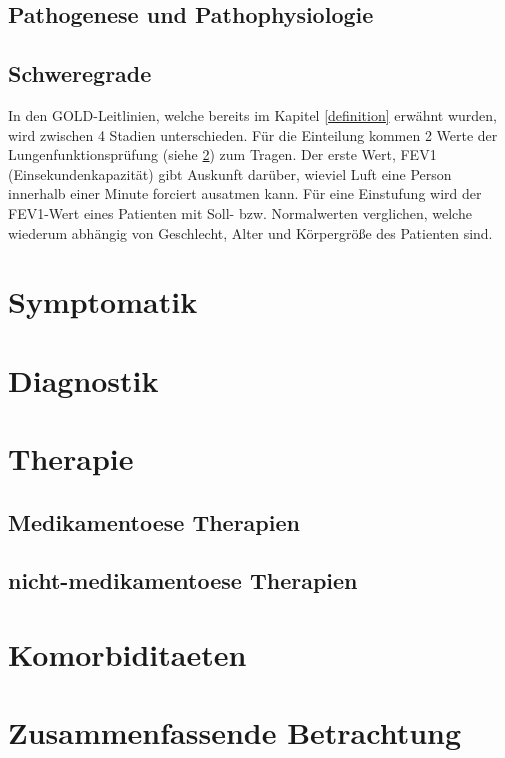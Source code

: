 \subsection{Pathogenese und Pathophysiologie}
\label{pathogenese}

\subsection{Schweregrade}
\label{schweregrade}
In den GOLD-Leitlinien, welche bereits im Kapitel \ref{definition} erwähnt wurden, wird zwischen 4 Stadien unterschieden. Für die Einteilung kommen 2 Werte der Lungenfunktionsprüfung (siehe \ref{diagnostik}) zum Tragen. Der erste Wert, FEV1 (Einsekundenkapazität) gibt Auskunft darüber, wieviel Luft eine Person innerhalb einer Minute forciert ausatmen kann. Für eine Einstufung wird der FEV1-Wert eines Patienten mit Soll- bzw. Normalwerten verglichen, welche wiederum abhängig von Geschlecht, Alter und Körpergröße des Patienten sind.

\section{Symptomatik}
\label{symptomatik}

\section{Diagnostik}
\label{diagnostik}

\section{Therapie}
\label{therapie}

\subsection{Medikamentoese Therapien}
\label{medikamtentoese therapien}

\subsection{nicht-medikamentoese Therapien}
\label{nicht-medikamentoese therapien}

\section{Komorbiditaeten}
\label{komorbiditaeten}


\section{Zusammenfassende Betrachtung}
\label{zusammenfassende betrachtung}

\newpage\thispagestyle{empty}